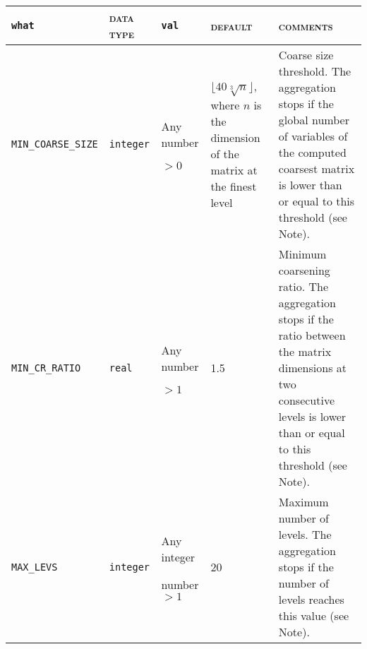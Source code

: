 \bsideways
\begin{center}
\begin{tabular}{|p{3.9cm}|l|p{2.3cm}|p{2.9cm}|p{6.9cm}|}
\hline
\verb|what|              & \textsc{data type}        &  \verb|val|      &  \textsc{default}  &
\textsc{comments} \\ \hline
\verb|MIN_COARSE_SIZE| & \verb|integer|
                         & Any number \par $> 0$
                         & $\lfloor 40 \sqrt[3]{n} \rfloor$, where $n$ is the dimension
                            of the matrix at the finest level
                         & Coarse size threshold. The aggregation stops
                            if  the global number of variables of the
                            computed coarsest matrix
                            is lower than or equal to this threshold
                           (see Note).
                           \\ \hline  
\verb|MIN_CR_RATIO| & \verb|real|
                         & Any number \par $> 1$
                         & 1.5
                         & Minimum coarsening ratio. The aggregation stops
                            if the ratio between the matrix dimensions
                            at two consecutive levels is lower than or equal to this
                            threshold (see Note).\\ \hline   
\verb|MAX_LEVS| & \verb|integer|
                         & Any integer \par number $> 1$
                         & 20
                         & Maximum number of levels. The aggregation stops
                           if the number of levels reaches this value (see Note). \\ \hline  

\end{tabular}
\end{center}
